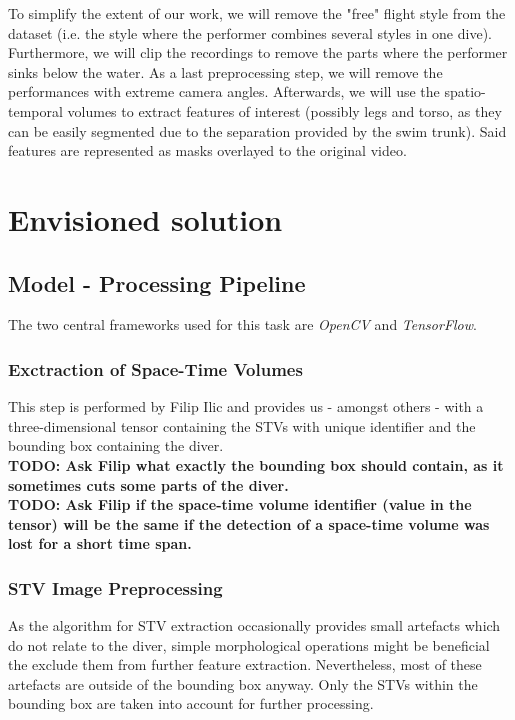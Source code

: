 \documentclass[10pt]{article}
\begin{document}
To simplify the extent of our work, we will remove the "free" flight style  from the dataset (i.e. the style where the performer combines several styles in one dive). Furthermore, we will clip the recordings to remove the parts where the performer sinks below the water. As a last preprocessing step, we will remove the performances with extreme camera angles. Afterwards, we will use the spatio-temporal volumes to extract features of interest (possibly legs and torso, as they can be easily segmented due to the separation provided by the swim trunk). Said features are represented as masks overlayed to the original video.

\section{Envisioned solution}

\subsection{Model - Processing Pipeline}
The two central frameworks used for this task are \emph{OpenCV} and \emph{TensorFlow}.

\subsubsection{Exctraction of Space-Time Volumes}
This step is performed by Filip Ilic and provides us - amongst others - with a three-dimensional tensor containing the STVs with unique identifier and the bounding box containing the diver.
\\
\textbf{TODO: Ask Filip what exactly the bounding box should contain, as it sometimes cuts some parts of the diver.}\\
\textbf{TODO: Ask Filip if the space-time volume identifier (value in the tensor) will be the same if the detection of a space-time volume was lost for a short time span.}

\subsubsection{STV Image Preprocessing}
As the algorithm for STV extraction occasionally provides small artefacts which do not relate to the diver, simple morphological operations might be beneficial the exclude them from further feature extraction. Nevertheless, most of these artefacts are outside of the bounding box anyway. Only the STVs within the bounding box are taken into account for further processing.
\end{document}
